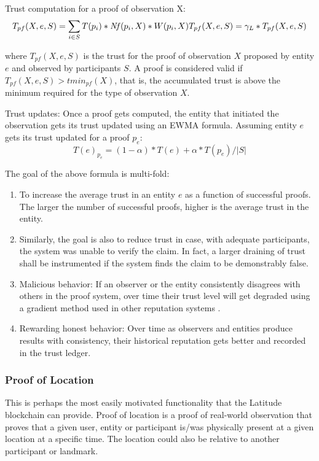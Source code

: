\noindent
Trust computation for a proof of observation X:
\begin{equation*}
    \label{eq_trust_compute}
    T_{pf}(X, e, S) = \sum_{i\in S} T(p_i) * \mathit{Nf}(p_i, X) * W(p_i, X)
    T_{pf}(X, e, S) = \gamma_L * T_{pf}(X, e, S)
\end{equation*}

where $T_{pf}(X, e, S)$ is the trust for the proof of observation $X$ proposed by entity $e$ and observed by
participants $S$. A proof is considered valid if $T_{pf}(X, e, S) > tmin_{pf}(X)$, that is, the accumulated trust is
above the minimum required for the type of observation $X$.

\noindent
Trust updates: Once a proof gets computed, the entity that initiated the observation gets its trust updated using an
EWMA formula. Assuming entity $e$ gets its trust updated for a proof $p_e$:
\begin{equation*}
    T(e)_{p_e} = (1 - \alpha) * T(e) + \alpha * T(p_e) / |S|
\end{equation*}

The goal of the above formula is multi-fold:
\begin{enumerate}
    \item To increase the average trust in an entity $e$ as a function of successful proofs. The larger the number of
        successful proofs, higher is the average trust in the entity.
    \item Similarly, the goal is also to reduce trust in case, with adequate participants, the system was unable to
        verify the claim. In fact, a larger draining of trust shall be instrumented if the system finds the claim to be
        demonstrably false.
    \item Malicious behavior: If an observer or the entity consistently disagrees with others in the proof system,
        over time their trust level will get degraded using a gradient method used in other reputation systems
        \cite{sen2010}.
    \item Rewarding honest behavior: Over time as observers and entities produce results with consistency, their
        historical reputation gets better and recorded in the trust ledger.
\end{enumerate}

\subsubsection{Proof of Location}

This is perhaps the most easily motivated functionality that the Latitude blockchain can provide. Proof of location is a
proof of real-world observation that proves that a given user, entity or participant is/was physically present at a given
location at a specific time. The location could also be relative to another participant or landmark.


